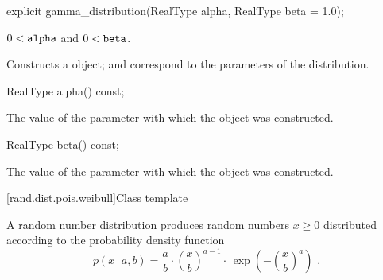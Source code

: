 %
\begin{itemdecl}
explicit gamma_distribution(RealType alpha, RealType beta = 1.0);
\end{itemdecl}

\begin{itemdescr}
\pnum
\requires $0 < \texttt{alpha}$ and $0 < \texttt{beta}$.

\pnum
\effects Constructs a  object;
 and 
correspond to the parameters of the distribution.
\end{itemdescr}

%
\begin{itemdecl}
RealType alpha() const;
\end{itemdecl}

\begin{itemdescr}
\pnum\returns The value of the  parameter
 with which the object was constructed.
\end{itemdescr}

%
\begin{itemdecl}
RealType beta() const;
\end{itemdecl}

\begin{itemdescr}
\pnum\returns The value of the  parameter
 with which the object was constructed.
\end{itemdescr}


[rand.dist.pois.weibull]{Class template }%
%
%

\pnum
A  random number distribution
produces random numbers $x \geq 0$
distributed according to
the probability density function%
%
%
\[ p(x\,|\,a,b) = \frac{a}{b}
     \cdot \left(\frac{x}{b}\right)^{a-1}
     \cdot \, \exp\left( -\left(\frac{x}{b}\right)^a\right)
     \text{ .} \]

